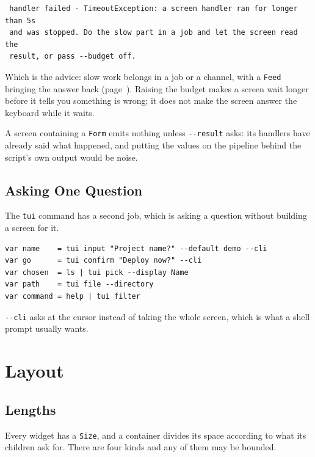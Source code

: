\documentclass[11pt,a4paper,twoside,openany]{book}
\newcommand{\code}[1]{\texttt{\small #1}}
\begin{document}
\begin{verbatim}
 handler failed - TimeoutException: a screen handler ran for longer than 5s
 and was stopped. Do the slow part in a job and let the screen read the
 result, or pass --budget off.
\end{verbatim}

\noindent Which is the advice: slow work belongs in a job or a channel, with a
\code{Feed} bringing the answer back (page~\pageref{sec:feeds}). Raising the budget
makes a screen wait longer before it tells you something is wrong; it does not make
the screen answer the keyboard while it waits.

A screen containing a \code{Form} emits nothing unless \code{-{}-result} asks: its
handlers have already said what happened, and putting the values on the pipeline
behind the script's own output would be noise.

\section{Asking One Question}

The \code{tui} command has a second job, which is asking a question without
building a screen for it.

\begin{lstlisting}
var name    = tui input "Project name?" --default demo --cli
var go      = tui confirm "Deploy now?" --cli
var chosen  = ls | tui pick --display Name
var path    = tui file --directory
var command = help | tui filter
\end{lstlisting}

\code{-{}-cli} asks at the cursor instead of taking the whole screen, which is what
a shell prompt usually wants.

\chapter{Layout}

\section{Lengths}

Every widget has a \code{Size}, and a container divides its space according to
what its children ask for. There are four kinds and any of them may be bounded.
\end{document}
